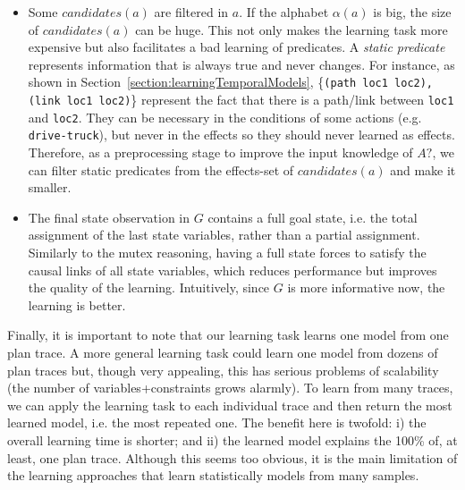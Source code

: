 \documentclass{ecai}
\begin{document}
\begin{itemize}
	\item Some $candidates(a)$ are filtered in $a$. If the alphabet $\alpha(a)$ is big, the size of $candidates(a)$ can be huge. This not only makes the learning task more expensive but also facilitates a bad learning of predicates. A \textit{static predicate} represents information that is always true and never changes. For instance, as shown in Section~\ref{section:learningTemporalModels}, \{\texttt{(path loc1 loc2), (link loc1 loc2)}\} represent the fact that there is a path/link between \texttt{loc1} and \texttt{loc2}.	
	They can be necessary in the conditions of some actions (e.g. \texttt{drive-truck}), but never in the effects so they should never learned as effects. Therefore, as a preprocessing stage to improve the input knowledge of $A?$, we can filter static predicates from the effects-set of $candidates(a)$ and make it smaller. 
	
	\item The final state observation in $G$ contains a full goal state, i.e. the total assignment of the last state variables, rather than a partial assignment. Similarly to the mutex reasoning, having a full state forces to satisfy the causal links of all state variables, which reduces performance but improves the quality of the learning. Intuitively, since $G$ is more informative now, the learning is better.

\end{itemize}	



Finally, it is important to note that our learning task learns one model from one plan trace. A more general learning task could learn one model from dozens of plan traces but, though very appealing, this has serious problems of scalability (the number of variables+constraints grows alarmly). 
To learn from many traces, we can apply the learning task to each individual trace and then return the most learned model, i.e. the most repeated one.
The benefit here is twofold: i) the overall learning time is shorter; and ii) the learned model explains the 100\% of, at least, one plan trace. Although this seems too obvious, it is the main limitation of the learning approaches that learn statistically models from many samples.


 
\end{document}
